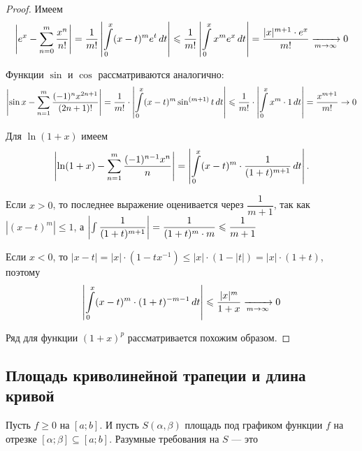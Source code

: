 \documentclass[a4paper]{article}
\theoremstyle{named}
\renewcommand{\int}{\intop}
\begin{document}
    	\begin{proof}
    		Имеем
    		\begin{equation*}
    			\left|e^x - \sum_{n = 0}^m \dfrac{x^n}{n!}\right|
    			= \dfrac{1}{m!} \left|\int_0^x (x - t)^m e^t \dd t\right|
                \leq \dfrac{1}{m!} \left|\int_0^x x^m e^x \dd t\right|
    			= \dfrac{|x|^{m + 1} \cdot e^x}{m!} \xrightarrow[m \to \infty]{} 0
    		\end{equation*}

    		Функции $\sin$ и $\cos$ рассматриваются аналогично:
            \begin{equation*}
                \left|\sin x - \sum_{n = 1}^m \dfrac{(-1)^n x^{2n + 1}}{(2n + 1)!}\right|
                = \dfrac{1}{m!} \cdot \left|\int_0^x (x - t)^m \sin^{(m + 1)} t \dd t\right|
                \leq \dfrac{1}{m!} \cdot \left|\int_0^x x^m \cdot 1 \dd t\right|
                = \dfrac{x^{m + 1}}{m!} \to 0
            \end{equation*}

            Для $\ln(1 + x)$ имеем
    		\begin{equation*}
    			\left|\ln(1 + x) - \sum_{n = 1}^m \dfrac{(-1)^{n - 1}x^n}{n}\right| = \left|\int_0^x(x - t)^m \cdot \dfrac{1}{(1 + t)^{m + 1}} \dd t\right|.
    		\end{equation*}

    		Если $x > 0$, то последнее выражение оценивается через $\dfrac{1}{m + 1}$, так как $|(x - t)^m| \leq 1$, а $\left|\int \dfrac{1}{(1 + t)^{m + 1}}\right| = \dfrac{1}{(1 + t)^m \cdot m} \leq \dfrac{1}{m + 1}$ 

            Если $x < 0$, то $|x - t| = |x| \cdot (1 - tx^{-1}) \leq |x| \cdot (1 - |t|) = |x| \cdot (1 + t)$, поэтому
    		\begin{equation*}
    			\left|\int_0^x (x - t)^m \cdot (1 + t)^{-m - 1} \dd t\right| \leq \dfrac{|x|^m}{1 + x} \xrightarrow[m \to \infty]{} 0
    		\end{equation*}

    		Ряд для функции $(1 + x)^p$ рассматривается похожим образом.
    	\end{proof}

        \subsection{Площадь криволинейной трапеции и длина кривой}

        Пусть $f \geq 0$ на $[a; b]$. И пусть $S(\alpha, \beta)$ площадь под графиком функции $f$ на отрезке $[\alpha; \beta] \subseteq [a; b]$. Разумные требования на $S$ --- это
\end{document}
